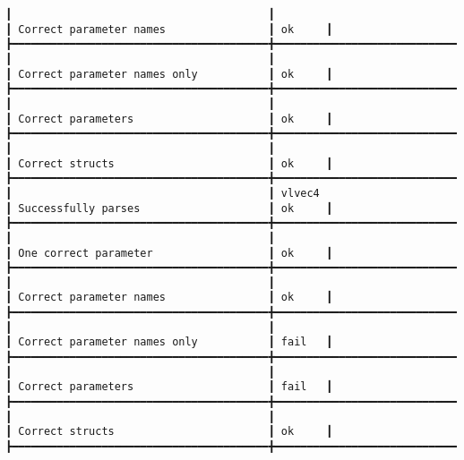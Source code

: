 \documentclass[12pt,twoside,notitlepage]{report}
\begin{document}
\begin{listing}[H]
\begin{verbatim}
┃                                        ┃                                        ┃ Correct parameter names                ┃ ok     ┃
┣━━━━━━━━━━━━━━━━━━━━━━━━━━━━━━━━━━━━━━━━╋━━━━━━━━━━━━━━━━━━━━━━━━━━━━━━━━━━━━━━━━╋━━━━━━━━━━━━━━━━━━━━━━━━━━━━━━━━━━━━━━━━╋━━━━━━━━┫
┃                                        ┃                                        ┃ Correct parameter names only           ┃ ok     ┃
┣━━━━━━━━━━━━━━━━━━━━━━━━━━━━━━━━━━━━━━━━╋━━━━━━━━━━━━━━━━━━━━━━━━━━━━━━━━━━━━━━━━╋━━━━━━━━━━━━━━━━━━━━━━━━━━━━━━━━━━━━━━━━╋━━━━━━━━┫
┃                                        ┃                                        ┃ Correct parameters                     ┃ ok     ┃
┣━━━━━━━━━━━━━━━━━━━━━━━━━━━━━━━━━━━━━━━━╋━━━━━━━━━━━━━━━━━━━━━━━━━━━━━━━━━━━━━━━━╋━━━━━━━━━━━━━━━━━━━━━━━━━━━━━━━━━━━━━━━━╋━━━━━━━━┫
┃                                        ┃                                        ┃ Correct structs                        ┃ ok     ┃
┣━━━━━━━━━━━━━━━━━━━━━━━━━━━━━━━━━━━━━━━━╋━━━━━━━━━━━━━━━━━━━━━━━━━━━━━━━━━━━━━━━━╋━━━━━━━━━━━━━━━━━━━━━━━━━━━━━━━━━━━━━━━━╋━━━━━━━━┫
┃                                        ┃ vlvec4                                 ┃ Successfully parses                    ┃ ok     ┃
┣━━━━━━━━━━━━━━━━━━━━━━━━━━━━━━━━━━━━━━━━╋━━━━━━━━━━━━━━━━━━━━━━━━━━━━━━━━━━━━━━━━╋━━━━━━━━━━━━━━━━━━━━━━━━━━━━━━━━━━━━━━━━╋━━━━━━━━┫
┃                                        ┃                                        ┃ One correct parameter                  ┃ ok     ┃
┣━━━━━━━━━━━━━━━━━━━━━━━━━━━━━━━━━━━━━━━━╋━━━━━━━━━━━━━━━━━━━━━━━━━━━━━━━━━━━━━━━━╋━━━━━━━━━━━━━━━━━━━━━━━━━━━━━━━━━━━━━━━━╋━━━━━━━━┫
┃                                        ┃                                        ┃ Correct parameter names                ┃ ok     ┃
┣━━━━━━━━━━━━━━━━━━━━━━━━━━━━━━━━━━━━━━━━╋━━━━━━━━━━━━━━━━━━━━━━━━━━━━━━━━━━━━━━━━╋━━━━━━━━━━━━━━━━━━━━━━━━━━━━━━━━━━━━━━━━╋━━━━━━━━┫
┃                                        ┃                                        ┃ Correct parameter names only           ┃ fail   ┃
┣━━━━━━━━━━━━━━━━━━━━━━━━━━━━━━━━━━━━━━━━╋━━━━━━━━━━━━━━━━━━━━━━━━━━━━━━━━━━━━━━━━╋━━━━━━━━━━━━━━━━━━━━━━━━━━━━━━━━━━━━━━━━╋━━━━━━━━┫
┃                                        ┃                                        ┃ Correct parameters                     ┃ fail   ┃
┣━━━━━━━━━━━━━━━━━━━━━━━━━━━━━━━━━━━━━━━━╋━━━━━━━━━━━━━━━━━━━━━━━━━━━━━━━━━━━━━━━━╋━━━━━━━━━━━━━━━━━━━━━━━━━━━━━━━━━━━━━━━━╋━━━━━━━━┫
┃                                        ┃                                        ┃ Correct structs                        ┃ ok     ┃
┣━━━━━━━━━━━━━━━━━━━━━━━━━━━━━━━━━━━━━━━━╋━━━━━━━━━━━━━━━━━━━━━━━━━━━━━━━━━━━━━━━━╋━━━━━━━━━━━━━━━━━━━━━━━━━━━━━━━━━━━━━━━━╋━━━━━━━━┫
\end{verbatim}
\caption{Sample of verbose test results\label{verbose}}
\end{listing}
\end{document}
